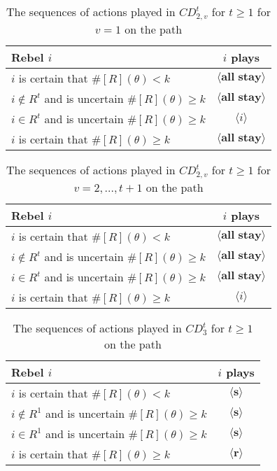 \documentclass[12pt,letter]{article}
\theoremstyle{definition}
\theoremstyle{remark}
\theoremstyle{claim}
\begin{document}
\begin{table}[!htbp]
\caption{The sequences of actions played in $CD^t_{2,v}$ for $t\geq 1$ for $v=1$ on the path}
\label{Table_cdt21}
\begin{center}
\begin{tabular}{l c}
Rebel $i$ 	 	&  	$i$ plays		 \\
\hline
\hline
$i$ is certain that $\#[R](\theta)<k$ 	& 	$\langle \textbf{all stay} \rangle$	\\
$i\notin R^{t}$ and is uncertain $\#[R](\theta)\geq k$	& 	$\langle \textbf{all stay} \rangle$	\\
$i\in R^{t}$ and is uncertain $\#[R](\theta)\geq k$ &  $\langle i \rangle$  \\
$i$ is certain that $\#[R](\theta)\geq k$ &  $\langle \textbf{all stay} \rangle$  \\
\hline
\end{tabular}
\end{center}
\end{table}


\begin{table}[!htbp]
\caption{The sequences of actions played in $CD^t_{2,v}$ for $t\geq 1$ for $v=2,...,t+1$ on the path}
\label{Table_cdt2t}
\begin{center}
\begin{tabular}{l c}
Rebel $i$ 	 	&  	$i$ plays		 \\
\hline
\hline
$i$ is certain that $\#[R](\theta)<k$ 	& 	$\langle \textbf{all stay} \rangle$	\\
$i\notin R^{t}$ and is uncertain $\#[R](\theta)\geq k$	& 	$\langle \textbf{all stay} \rangle$	\\
$i\in R^{t}$ and is uncertain $\#[R](\theta)\geq k$ &  $\langle \textbf{all stay} \rangle$  \\
$i$ is certain that $\#[R](\theta)\geq k$ &  $\langle i \rangle$  \\
\hline
\end{tabular}
\end{center}
\end{table}


\begin{table}[!htbp]
\caption{The sequences of actions played in $CD^t_{3}$ for $t\geq 1$ on the path}
\label{Table_cdt3v}
\begin{center}
\begin{tabular}{l c}
Rebel $i$ 	 	&  	$i$ plays		 \\
\hline
\hline
$i$ is certain that $\#[R](\theta)<k$ 	& 	$\langle \textbf{s} \rangle$	\\
$i\notin R^{1}$ and is uncertain $\#[R](\theta)\geq k$	& 	$\langle \textbf{s} \rangle$	\\
$i\in R^{1}$ and is uncertain $\#[R](\theta)\geq k$ &  $\langle \textbf{s} \rangle$  \\
$i$ is certain that $\#[R](\theta)\geq k$ &  $\langle \textbf{r} \rangle$  \\
\hline
\end{tabular}
\end{center}
\end{table}
\clearpage
\end{document}
